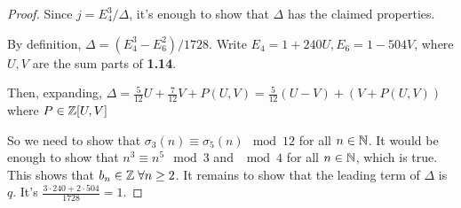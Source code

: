 \documentclass[10pt,a4paper]{article}
\begin{document}
\begin{proof}
  Since $j = E_4^3/\Delta$, it's enough to show that $\Delta$ has the claimed properties.

  By definition, $\Delta = (E_4^3 - E_6^2)/1728$. Write $E_4 = 1+240 U, E_6 = 1-504 V$, where $U, V$ are the sum parts of \textbf{1.14}.

  Then, expanding, $\Delta = \frac{5}{12}U + \frac{7}{12}V + P(U,V) = \frac{5}{12}(U-V)+(V+P(U,V))$ where $P \in \mathbb{Z}[U,V]$

  So we need to show that $\sigma_3(n) \equiv \sigma_5(n) \mod 12$ for all $n \in \mathbb{N}$. It would be enough to show that $n^3 \equiv n^5 \mod 3$ and $\mod 4$ for all $n \in \mathbb{N}$, which is true. This shows that $b_n \in \Z \forall n \geq 2$. It remains to show that the leading term of $\Delta$ is $q$. It's $\frac{3\cdot 240 + 2\cdot 504}{1728} = 1$.
\end{proof}
\end{document}
